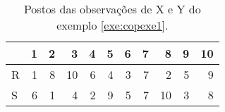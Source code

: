 \begin{table}[ht]
\centering
\caption{Postos das observações de X e Y do exemplo \ref{exe:copexe1}.} 
\label{tab:copexe2}
\begin{tabular}{lrrrrrrrrrr}
  \hline
 & 1 & 2 & 3 & 4 & 5 & 6 & 7 & 8 & 9 & 10 \\ 
  \hline
R &   1 &   8 &  10 &   6 &   4 &   3 &   7 &   2 &   5 &   9 \\ 
  S &   6 &   1 &   4 &   2 &   9 &   5 &   7 &  10 &   3 &   8 \\ 
   \hline
\end{tabular}
\end{table}
